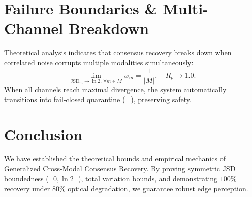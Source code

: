 \documentclass[conference]{IEEEtran}
\begin{document}
\section{Failure Boundaries \& Multi-Channel Breakdown}
Theoretical analysis indicates that consensus recovery breaks down when correlated noise corrupts multiple modalities simultaneously:
\begin{equation}
\lim_{\mathrm{JSD}_m \to \ln 2, \, \forall m \in M} w_m = \frac{1}{|M|}, \quad R_p \to 1.0.
\end{equation}
When all channels reach maximal divergence, the system automatically transitions into fail-closed quarantine ($\bot$), preserving safety.

\section{Conclusion}
We have established the theoretical bounds and empirical mechanics of Generalized Cross-Modal Consensus Recovery. By proving symmetric $\text{JSD}$ boundedness ($[0, \ln 2]$), total variation bounds, and demonstrating $100\%$ recovery under $80\%$ optical degradation, we guarantee robust edge perception.
\end{document}
